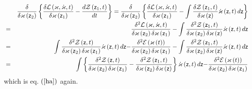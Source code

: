 \begin{eqnarray}
&&\frac{\delta }{\delta \varkappa \left( {\sf z}_{2}\right) }\left\{ \frac{%
\delta {\cal L}\left( {\cal \varkappa },{\cal \dot{\varkappa}},t\right) }{%
\delta {\cal \varkappa }\left( {\sf z}_{1}\right) }-\frac{d{\cal Z}\left( 
{\sf z}_{1},t\right) }{dt}\right\} =\frac{\delta }{\delta \varkappa \left( 
{\sf z}_{2}\right) }\left\{ \frac{\delta {\cal L}\left( {\cal \varkappa },%
{\cal \dot{\varkappa}},t\right) }{\delta {\cal \varkappa }\left( {\sf z}%
_{1}\right) }-\int \frac{\delta {\cal Z}\left( {\sf z}_{1},t\right) }{\delta
\varkappa \left( {\sf z}\right) }{\cal \dot{\varkappa}}\left( {\sf z}%
,t\right) d{\sf z}\right\}  \nonumber \\
&=&\frac{\delta ^{2}{\cal L}\left( {\cal \varkappa },{\cal \dot{\varkappa}}%
,t\right) }{\delta \varkappa \left( {\sf z}_{2}\right) \delta {\cal %
\varkappa }\left( {\sf z}_{1}\right) }-\int \frac{\delta ^{2}{\cal Z}\left( 
{\sf z}_{1},t\right) }{\delta \varkappa \left( {\sf z}_{2}\right) \delta
\varkappa \left( {\sf z}\right) }{\cal \dot{\varkappa}}\left( {\sf z}%
,t\right) d{\sf z}  \label{hc} \\
&=&\int \frac{\delta ^{2}{\cal Z}\left( {\sf z},t\right) }{\delta \varkappa
\left( {\sf z}_{2}\right) \delta {\cal \varkappa }\left( {\sf z}_{1}\right) }%
{\cal \dot{\varkappa}}\left( {\sf z},t\right) d{\sf z-}\frac{\delta ^{2}%
{\cal E}\left( {\cal \varkappa }\left( t\right) \right) }{\delta \varkappa
\left( {\sf z}_{2}\right) \delta {\cal \varkappa }\left( {\sf z}_{1}\right) }%
-\int \frac{\delta ^{2}{\cal Z}\left( {\sf z}_{1},t\right) }{\delta
\varkappa \left( {\sf z}_{2}\right) \delta \varkappa \left( {\sf z}\right) }%
{\cal \dot{\varkappa}}\left( {\sf z},t\right) d{\sf z}  \nonumber \\
&=&\int \left\{ \frac{\delta ^{2}{\cal Z}\left( {\sf z},t\right) }{\delta
\varkappa \left( {\sf z}_{2}\right) \delta {\cal \varkappa }\left( {\sf z}%
_{1}\right) }-\frac{\delta ^{2}{\cal Z}\left( {\sf z}_{1},t\right) }{\delta
\varkappa \left( {\sf z}_{2}\right) \delta \varkappa \left( {\sf z}\right) }%
\right\} {\cal \dot{\varkappa}}\left( {\sf z},t\right) d{\sf z-}\frac{\delta
^{2}{\cal E}\left( {\cal \varkappa }\left( t\right) \right) }{\delta
\varkappa \left( {\sf z}_{2}\right) \delta {\cal \varkappa }\left( {\sf z}%
_{1}\right) }
\end{eqnarray}%
which is eq. $\left( \ref{ha}\right) $ again.

